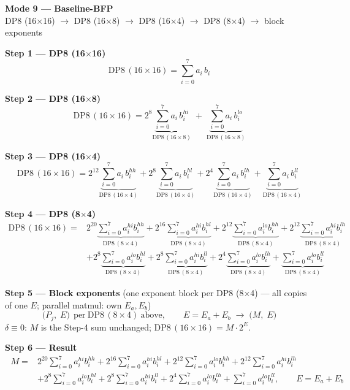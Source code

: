 \documentclass[fleqn]{article}
\newcommand{\DPop}[3]{\mathrm{DP#1}\,(#2\!\times\!#3)}
\begin{document}
\begin{center}
{\LARGE \textbf{Mode 9 --- Baseline-BFP}}\\[4pt]
{\large DP8 (16$\times$16) $\rightarrow$ DP8 (16$\times$8) $\rightarrow$ DP8 (16$\times$4) $\rightarrow$ DP8 (8$\times$4) $\rightarrow$ block exponents}
\end{center}

\vspace{0.3em}

\textbf{Step 1 --- DP8 (16$\times$16)}
\[ \DPop{8}{16}{16} = \sum_{i=0}^{7} a_i \, b_i \]

\textbf{Step 2 --- DP8 (16$\times$8)}
\[
\DPop{8}{16}{16}
  = 2^{8} \underbrace{\sum_{i=0}^{7} a_i \, b_i^{hi}}_{\DPop{8}{16}{8}}
  \; + \; \underbrace{\sum_{i=0}^{7} a_i \, b_i^{lo}}_{\DPop{8}{16}{8}}
\]

\textbf{Step 3 --- DP8 (16$\times$4)}
\[
\DPop{8}{16}{16}
  = 2^{12} \underbrace{\sum_{i=0}^{7} a_i \, b_i^{hh}}_{\DPop{8}{16}{4}}
  + 2^{8} \underbrace{\sum_{i=0}^{7} a_i \, b_i^{hl}}_{\DPop{8}{16}{4}}
  + 2^{4} \underbrace{\sum_{i=0}^{7} a_i \, b_i^{lh}}_{\DPop{8}{16}{4}}
  + \underbrace{\sum_{i=0}^{7} a_i \, b_i^{ll}}_{\DPop{8}{16}{4}}
\]

\textbf{Step 4 --- DP8 (8$\times$4)}
\begin{align*}
\DPop{8}{16}{16} = {}
  & 2^{20} \underbrace{\sum_{i=0}^{7} a_i^{hi} b_i^{hh}}_{\DPop{8}{8}{4}}
  + 2^{16} \underbrace{\sum_{i=0}^{7} a_i^{hi} b_i^{hl}}_{\DPop{8}{8}{4}}
  + 2^{12} \underbrace{\sum_{i=0}^{7} a_i^{lo} b_i^{hh}}_{\DPop{8}{8}{4}}
  + 2^{12} \underbrace{\sum_{i=0}^{7} a_i^{hi} b_i^{lh}}_{\DPop{8}{8}{4}} \\[0.3em]
  & + 2^{8} \underbrace{\sum_{i=0}^{7} a_i^{lo} b_i^{hl}}_{\DPop{8}{8}{4}}
  + 2^{8} \underbrace{\sum_{i=0}^{7} a_i^{hi} b_i^{ll}}_{\DPop{8}{8}{4}}
  + 2^{4} \underbrace{\sum_{i=0}^{7} a_i^{lo} b_i^{lh}}_{\DPop{8}{8}{4}}
  + \underbrace{\sum_{i=0}^{7} a_i^{lo} b_i^{ll}}_{\DPop{8}{8}{4}}
\end{align*}

\textbf{Step 5 --- Block exponents}\quad
{\small(one exponent block per DP8 (8$\times$4) --- all copies of one $E$; parallel matmul: own $E_a,E_b$)}
\[
\big(P_j,\; E\big)\ \ \text{per}\ \DPop{8}{8}{4}\ \text{above}, \qquad E = E_a + E_b
\;\longrightarrow\;
\big(M,\; E\big)
\]
$\delta\equiv0$: $M$ is the Step-4 sum unchanged; \quad $\DPop{8}{16}{16}=M\cdot2^{E}$.

\textbf{Step 6 --- Result}
\[
\boxed{\;
\begin{aligned}
M ={}& 2^{20}\!\sum_{i=0}^{7} a_i^{hi} b_i^{hh}
  + 2^{16}\!\sum_{i=0}^{7} a_i^{hi} b_i^{hl}
  + 2^{12}\!\sum_{i=0}^{7} a_i^{lo} b_i^{hh}
  + 2^{12}\!\sum_{i=0}^{7} a_i^{hi} b_i^{lh} \\
  & + 2^{8}\!\sum_{i=0}^{7} a_i^{lo} b_i^{hl}
  + 2^{8}\!\sum_{i=0}^{7} a_i^{hi} b_i^{ll}
  + 2^{4}\!\sum_{i=0}^{7} a_i^{lo} b_i^{lh}
  + \sum_{i=0}^{7} a_i^{lo} b_i^{ll},
\qquad E = E_a + E_b
\end{aligned}
\;}
\]
\end{document}
